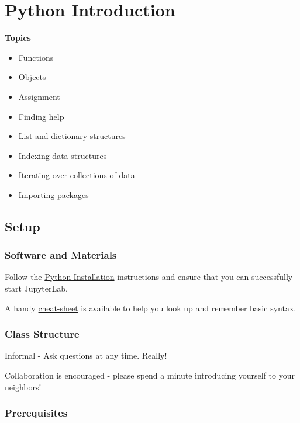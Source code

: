 \documentclass[
]{book}
\providecommand{\tightlist}{%
  \setlength{\itemsep}{0pt}\setlength{\parskip}{0pt}}
\begin{document}
\hypertarget{python-introduction}{%
\chapter{Python Introduction}\label{python-introduction}}

\textbf{Topics}

\begin{itemize}
\tightlist
\item
  Functions
\item
  Objects
\item
  Assignment
\item
  Finding help
\item
  List and dictionary structures
\item
  Indexing data structures
\item
  Iterating over collections of data
\item
  Importing packages
\end{itemize}

\hypertarget{setup-4}{%
\section{Setup}\label{setup-4}}

\hypertarget{software-and-materials-4}{%
\subsection{Software and Materials}\label{software-and-materials-4}}

Follow the \href{./PythonInstall.html}{Python Installation} instructions and ensure that you can successfully start JupyterLab.

A handy \href{Python/PythonIntro/python-cheat-sheet-basic.pdf}{cheat-sheet} is available to help you look up and remember basic syntax.

\hypertarget{class-structure-4}{%
\subsection{Class Structure}\label{class-structure-4}}

Informal - Ask questions at any time. Really!

Collaboration is encouraged - please spend a minute introducing yourself to your neighbors!

\hypertarget{prerequisites-4}{%
\subsection{Prerequisites}\label{prerequisites-4}}
\end{document}
